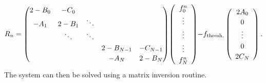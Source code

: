 \documentclass[11pt]{article}
\begin{document}
\begin{align}
  R_n = 
\begin{aligned}
    \renewcommand{\arraystretch}{1.2}
    \setlength\arraycolsep{5pt}
    \begin{pmatrix}
      2-B_0 & - C_0   \\ 
      -A_1  & 2-B_1 & \ddots \\
      & \ddots  & \ddots \\
      &    &      & 2-B_{N-1} & -C_{N-1} \\
      &    &      & -A_{N}    & 2-B_{N}
    \end{pmatrix}
  \end{aligned}
 \begin{aligned}
    \left(
    \begin{array}{c}
      f^{n}_{0} \\
      \vdots \\
      \vdots \\
      \vdots \\
      f^{n}_{N}
    \end{array}
     \right)   
  \end{aligned} 
 \begin{aligned}
    \renewcommand{\arraystretch}{1.2}
     -f_{\text{thresh.}} \left(
    \begin{array}{c}
      2A_0\\
      0 \\
      \vdots \\
      0 \\
      2C_N
    \end{array}
     \right).    
  \end{aligned} 
\end{align}
%
The system can then be solved using a matrix inversion routine.

\end{document}
